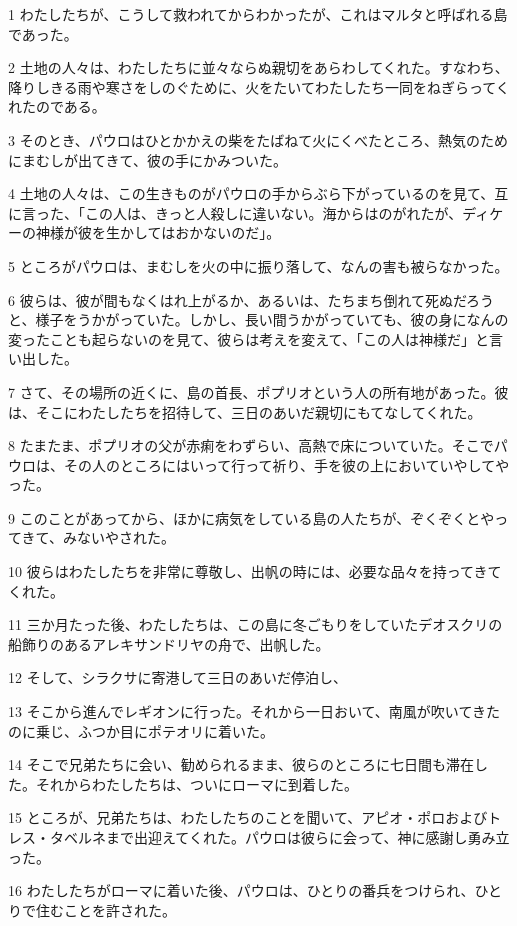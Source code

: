 \par 1 わたしたちが、こうして救われてからわかったが、これはマルタと呼ばれる島であった。
\par 2 土地の人々は、わたしたちに並々ならぬ親切をあらわしてくれた。すなわち、降りしきる雨や寒さをしのぐために、火をたいてわたしたち一同をねぎらってくれたのである。
\par 3 そのとき、パウロはひとかかえの柴をたばねて火にくべたところ、熱気のためにまむしが出てきて、彼の手にかみついた。
\par 4 土地の人々は、この生きものがパウロの手からぶら下がっているのを見て、互に言った、「この人は、きっと人殺しに違いない。海からはのがれたが、ディケーの神様が彼を生かしてはおかないのだ」。
\par 5 ところがパウロは、まむしを火の中に振り落して、なんの害も被らなかった。
\par 6 彼らは、彼が間もなくはれ上がるか、あるいは、たちまち倒れて死ぬだろうと、様子をうかがっていた。しかし、長い間うかがっていても、彼の身になんの変ったことも起らないのを見て、彼らは考えを変えて、「この人は神様だ」と言い出した。
\par 7 さて、その場所の近くに、島の首長、ポプリオという人の所有地があった。彼は、そこにわたしたちを招待して、三日のあいだ親切にもてなしてくれた。
\par 8 たまたま、ポプリオの父が赤痢をわずらい、高熱で床についていた。そこでパウロは、その人のところにはいって行って祈り、手を彼の上においていやしてやった。
\par 9 このことがあってから、ほかに病気をしている島の人たちが、ぞくぞくとやってきて、みないやされた。
\par 10 彼らはわたしたちを非常に尊敬し、出帆の時には、必要な品々を持ってきてくれた。
\par 11 三か月たった後、わたしたちは、この島に冬ごもりをしていたデオスクリの船飾りのあるアレキサンドリヤの舟で、出帆した。
\par 12 そして、シラクサに寄港して三日のあいだ停泊し、
\par 13 そこから進んでレギオンに行った。それから一日おいて、南風が吹いてきたのに乗じ、ふつか目にポテオリに着いた。
\par 14 そこで兄弟たちに会い、勧められるまま、彼らのところに七日間も滞在した。それからわたしたちは、ついにローマに到着した。
\par 15 ところが、兄弟たちは、わたしたちのことを聞いて、アピオ・ポロおよびトレス・タベルネまで出迎えてくれた。パウロは彼らに会って、神に感謝し勇み立った。
\par 16 わたしたちがローマに着いた後、パウロは、ひとりの番兵をつけられ、ひとりで住むことを許された。
